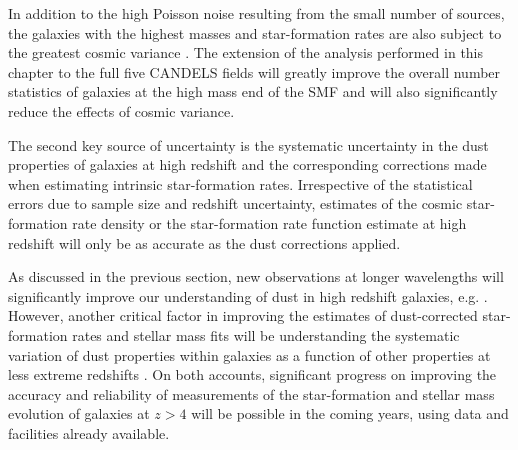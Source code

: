 In addition to the high Poisson noise resulting from the small number of sources, the galaxies with the highest masses and star-formation rates are also subject to the greatest cosmic variance \citep{Moster:2011ip}. The extension of the analysis performed in this chapter to the full five CANDELS fields will greatly improve the overall number statistics of galaxies at the high mass end of the SMF and will also significantly reduce the effects of cosmic variance.

The second key source of uncertainty is the systematic uncertainty in the dust properties of galaxies at high redshift and the corresponding corrections made when estimating intrinsic star-formation rates. Irrespective of the statistical errors due to sample size and redshift uncertainty, estimates of the cosmic star-formation rate density or the star-formation rate function estimate at high redshift will only be as accurate as the dust corrections applied. 

As discussed in the previous section, new observations at longer wavelengths will significantly improve our understanding of dust in high redshift galaxies, e.g. \citet{2015A&A...574A..19S}. However, another critical factor in improving the estimates of dust-corrected star-formation rates and stellar mass fits will be understanding the systematic variation of dust properties within galaxies as a function of other properties at less extreme redshifts \citep{Kriek:2013kx}. On both accounts, significant progress on improving the accuracy and reliability of measurements of the star-formation and stellar mass evolution of galaxies at $z>4$ will be possible in the coming years, using data and facilities already available.

